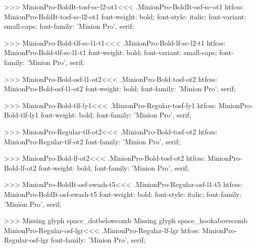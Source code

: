 {>>>
\<MinionPro-BoldIt-tosf-sc-l2-ot1\><<<
.MinionPro-BoldIt-osf-sc-ot1
htfcss:  MinionPro-BoldIt-tosf-sc-l2-ot1  font-weight: bold; font-style: italic; font-variant: small-caps; font-family: 'Minion Pro', serif;

>>>
\<MinionPro-Bold-tlf-sc-l1-t1\><<<
.MinionPro-Bold-lf-sc-l2-t1
htfcss:  MinionPro-Bold-tlf-sc-l1-t1  font-weight: bold; font-variant: small-caps; font-family: 'Minion Pro', serif;

>>>
\<MinionPro-Bold-osf-l1-ot2\><<<
.MinionPro-Bold-tosf-ot2
htfcss:  MinionPro-Bold-osf-l1-ot2  font-weight: bold; font-family: 'Minion Pro', serif;

>>>
\<MinionPro-Bold-tlf-ly1\><<<
.MinionPro-Regular-tosf-ly1
htfcss:  MinionPro-Bold-tlf-ly1  font-weight: bold; font-family: 'Minion Pro', serif;

>>>
\<MinionPro-Regular-tlf-ot2\><<<
.MinionPro-Bold-tosf-ot2
htfcss:  MinionPro-Regular-tlf-ot2  font-family: 'Minion Pro', serif;

>>>
\<MinionPro-Bold-lf-ot2\><<<
.MinionPro-Bold-tosf-ot2
htfcss:  MinionPro-Bold-lf-ot2  font-weight: bold; font-family: 'Minion Pro', serif;

>>>
\<MinionPro-BoldIt-osf-swash-t5\><<<
.MinionPro-Regular-osf-l1-t5
htfcss:  MinionPro-BoldIt-osf-swash-t5  font-weight: bold; font-style: italic; font-family: 'Minion Pro', serif;

>>>
Missing glyph	space_dotbelowcomb
Missing glyph	space_hookabovecomb
\<MinionPro-Regular-osf-lgr\><<<
.MinionPro-Regular-lf-lgr
htfcss:  MinionPro-Regular-osf-lgr  font-family: 'Minion Pro', serif;

}

